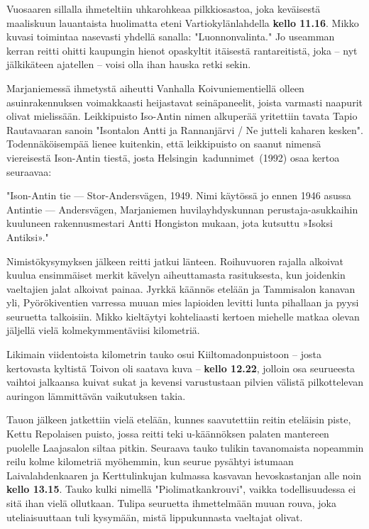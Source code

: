 \begin{multicols}{2}
	Vuosaaren sillalla ihmeteltiin uhkarohkeaa pilkkiosastoa, joka
	keväisestä maaliskuun lauantaista huolimatta eteni Vartiokylänlahdella
	\textbf{kello 11.16}. Mikko kuvasi toimintaa nasevasti yhdellä sanalla:
	"Luonnonvalinta." Jo useamman kerran reitti ohitti kaupungin hienot
	opaskyltit itäisestä rantareitistä, joka – nyt jälkikäteen ajatellen –
	voisi olla ihan hauska retki sekin.

	Marjaniemessä ihmetystä aiheutti Vanhalla Koivuniementiellä olleen
	asuinrakennuksen voimakkaasti heijastavat seinäpaneelit, joista
	varmasti naapurit olivat mielissään. Leikkipuisto Iso-Antin nimen
	alkuperää yritettiin tavata Tapio Rautavaaran sanoin "Isontalon Antti
	ja Rannanjärvi / Ne jutteli kaharen kesken". Todennäköisempää lienee
	kuitenkin, että leikkipuisto on saanut nimensä viereisestä Ison-Antin
	tiestä, josta \mbox{Helsingin kadunnimet (1992)} osaa kertoa seuraavaa:

	"Ison-Antin tie — Stor-Andersvägen, 1949. Nimi käytössä jo ennen 1946
	asussa Antintie — Andersvägen, Marjaniemen huvilayhdyskunnan
	perustaja-asukkaihin kuuluneen rakennusmestari Antti Hongiston mukaan,
	jota kutsuttu »Isoksi Antiksi»."

	Nimistökysymyksen jälkeen reitti jatkui länteen. Roihuvuoren rajalla
	alkoivat kuulua ensimmäiset merkit kävelyn aiheuttamasta rasituksesta,
	kun joidenkin vaeltajien jalat alkoivat painaa. Jyrkkä käännös etelään
	ja Tammisalon kanavan yli, Pyörökiventien varressa muuan mies lapioiden
	levitti lunta pihallaan ja pyysi seuruetta talkoisiin. Mikko kieltäytyi
	kohteliaasti kertoen miehelle matkaa olevan jäljellä vielä
	kolmekymmentäviisi kilometriä.

	Likimain viidentoista kilometrin tauko osui Kiiltomadonpuistoon – josta
	kertovasta kyltistä Toivon oli saatava kuva – \textbf{kello 12.22},
	jolloin osa seurueesta vaihtoi jalkaansa kuivat sukat ja kevensi
	varustustaan pilvien välistä pilkottelevan auringon lämmittävän
	vaikutuksen takia.

	Tauon jälkeen jatkettiin vielä etelään, kunnes saavutettiin reitin
	eteläisin piste, Kettu Repolaisen puisto, jossa reitti teki
	u-käännöksen palaten mantereen puolelle Laajasalon siltaa pitkin.
	Seuraava tauko tulikin tavanomaista nopeammin reilu kolme kilometriä
	myöhemmin, kun seurue pysähtyi istumaan Laivalahdenkaaren ja
	Kerttulinkujan kulmassa kasvavan hevoskastanjan alle noin \textbf{kello
	13.15}. Tauko kulki nimellä "Piolimatkankrouvi", vaikka todellisuudessa
	ei sitä ihan vielä ollutkaan. Tulipa seuruetta ihmettelmään muuan
	rouva, joka uteliaisuuttaan tuli kysymään, mistä lippukunnasta
	vaeltajat olivat.


\end{multicols}
